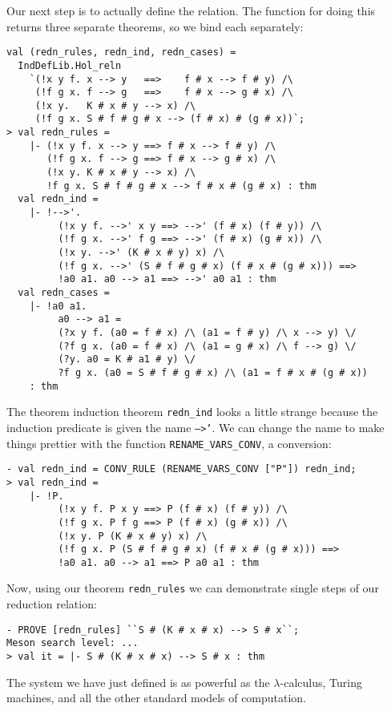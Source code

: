 \documentclass[12pt]{article}
\begin{document}
Our next step is to actually define the relation.  The function for
doing this returns three separate theorems, so we bind each
separately:
\begin{session}\begin{verbatim}
val (redn_rules, redn_ind, redn_cases) =
  IndDefLib.Hol_reln
    `(!x y f. x --> y   ==>    f # x --> f # y) /\
     (!f g x. f --> g   ==>    f # x --> g # x) /\
     (!x y.   K # x # y --> x) /\
     (!f g x. S # f # g # x --> (f # x) # (g # x))`;
> val redn_rules =
    |- (!x y f. x --> y ==> f # x --> f # y) /\
       (!f g x. f --> g ==> f # x --> g # x) /\
       (!x y. K # x # y --> x) /\
       !f g x. S # f # g # x --> f # x # (g # x) : thm
  val redn_ind =
    |- !-->'.
         (!x y f. -->' x y ==> -->' (f # x) (f # y)) /\
         (!f g x. -->' f g ==> -->' (f # x) (g # x)) /\
         (!x y. -->' (K # x # y) x) /\
         (!f g x. -->' (S # f # g # x) (f # x # (g # x))) ==>
         !a0 a1. a0 --> a1 ==> -->' a0 a1 : thm
  val redn_cases =
    |- !a0 a1.
         a0 --> a1 =
         (?x y f. (a0 = f # x) /\ (a1 = f # y) /\ x --> y) \/
         (?f g x. (a0 = f # x) /\ (a1 = g # x) /\ f --> g) \/
         (?y. a0 = K # a1 # y) \/
         ?f g x. (a0 = S # f # g # x) /\ (a1 = f # x # (g # x))
    : thm
\end{verbatim}\end{session}
The theorem induction theorem \texttt{redn\_ind} looks a little
strange because the induction predicate is given the name
\texttt{-->'}.  We can change the name to make things prettier with
the function \texttt{RENAME\_VARS\_CONV}, a conversion:
\begin{session}\begin{verbatim}
- val redn_ind = CONV_RULE (RENAME_VARS_CONV ["P"]) redn_ind;
> val redn_ind =
    |- !P.
         (!x y f. P x y ==> P (f # x) (f # y)) /\
         (!f g x. P f g ==> P (f # x) (g # x)) /\
         (!x y. P (K # x # y) x) /\
         (!f g x. P (S # f # g # x) (f # x # (g # x))) ==>
         !a0 a1. a0 --> a1 ==> P a0 a1 : thm
\end{verbatim}\end{session}

Now, using our theorem \texttt{redn\_rules} we can demonstrate single
steps of our reduction relation:
\begin{session}\begin{verbatim}
- PROVE [redn_rules] ``S # (K # x # x) --> S # x``;
Meson search level: ...
> val it = |- S # (K # x # x) --> S # x : thm
\end{verbatim}\end{session}
    The system we have just defined is as powerful as the
    $\lambda$-calculus, Turing machines, and all the other standard
    models of computation.
\end{document}
